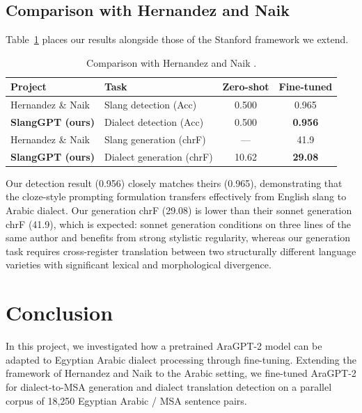 \documentclass[11pt]{article}
\begin{document}
\subsection{Comparison with Hernandez and Naik}

Table~\ref{tab:comparison} places our results alongside those of the Stanford framework we extend.

\begin{table}[H]
\centering
\caption{Comparison with Hernandez and Naik \cite{hernandez2025}.}
\label{tab:comparison}
\begin{tabular}{llcc}
\toprule
\textbf{Project} & \textbf{Task} & \textbf{Zero-shot} & \textbf{Fine-tuned} \\
\midrule
Hernandez \& Naik & Slang detection (Acc) & 0.500 & 0.965 \\
\textbf{SlangGPT (ours)} & Dialect detection (Acc) & 0.500 & \textbf{0.956} \\
\midrule
Hernandez \& Naik & Slang generation (chrF) & — & 41.9 \\
\textbf{SlangGPT (ours)} & Dialect generation (chrF) & 10.62 & \textbf{29.08} \\
\bottomrule
\end{tabular}
\end{table}

Our detection result (0.956) closely matches theirs (0.965), demonstrating that the cloze-style prompting formulation transfers effectively from English slang to Arabic dialect. Our generation chrF (29.08) is lower than their sonnet generation chrF (41.9), which is expected: sonnet generation conditions on three lines of the same author and benefits from strong stylistic regularity, whereas our generation task requires cross-register translation between two structurally different language varieties with significant lexical and morphological divergence.

\section{Conclusion}

In this project, we investigated how a pretrained AraGPT-2 model can be adapted to Egyptian Arabic dialect processing through fine-tuning. Extending the framework of Hernandez and Naik \cite{hernandez2025} to the Arabic setting, we fine-tuned AraGPT-2 for dialect-to-MSA generation and dialect translation detection on a parallel corpus of 18,250 Egyptian Arabic / MSA sentence pairs.
\end{document}
